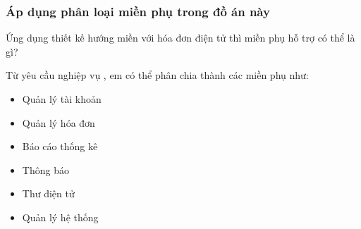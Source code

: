 
\subsubsection{Áp dụng phân loại miền phụ trong đồ án này}

Ứng dụng thiết kế hướng miền với hóa đơn điện tử thì miền phụ hỗ trợ có thể là gì?

Từ yêu cầu nghiệp vụ , em  có thể phân chia thành các miền phụ như: 
\begin{itemize}
    \item Quản lý tài khoản
    \item Quản lý hóa đơn
    \item Báo cáo thống kê
\item Thông báo 
\item Thư điện tử
\item Quản lý hệ thống 
\end{itemize}
